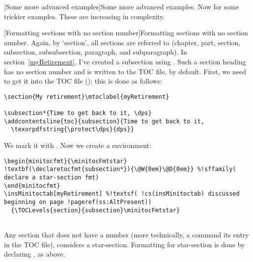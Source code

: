 \documentclass[10pt]{article}
\makeatletter
\renewcommand*{\theparagraph}{\texorpdfstring{\protect\P}{\textparagraph}}
\renewcommand*{\thesubparagraph}{\texorpdfstring{\protect\P\protect\P}{\textparagraph\textparagraph}}
\renewcommand{\paragraph}
    {\renewcommand{\@seccntformat}[1]{\theparagraph\space}%
    \@startsection{paragraph}{4}{0pt}{6pt}{-3pt}{\bfseries}}
\renewcommand{\subparagraph}
    {\renewcommand{\@seccntformat}[1]{\thesubparagraph\space}%
    \@startsection{subparagraph}{5}{\parindent}{6pt}{-3pt}{\bfseries}}
\edef\amtIndent{\the\parindent}
\def\dps{$\hbox{$\mathfrak D$\kern-.3em\hbox{$\mathfrak P$}%
   \kern-.6em \hbox{$\mathcal S$}}$}
\def\dps{$\mbox{$\mathfrak D$\kern-.3em\mbox{$\mathfrak P$}%
   \kern-.6em \hbox{$\mathcal S$}}$}
\newcommand{\insMinitoctab}[2][]{%
  \begin{center}#2
  \begin{tabular}{c}\toprule
  \begin{minipage}[c]{0.8\linewidth}
  \insertminitoc[#1]
  \end{minipage}\\ \bottomrule
  \end{tabular}
  \end{center}
}
\makeatother
\begin{document}


\paragraph[Some more advanced examples]{Some more advanced examples.}
Now for some trickier examples. These are increasing in complexity.

\subparagraph[Formatting sections with no section number]{Formatting sections
with no section number.}\label{spara:noNums} Again, by `section', all sections are referred to
(chapter, part, section, subsection, subsubsection, paragraph, and
subparagraph). In section~\ref{myRetirement}, I've created a subsection using
. Such a section heading has no section number and is written
to the TOC file, by default. First, we need to get it into the TOC file (); this
is done as follows:
\begin{Verbatim}[xleftmargin=\amtIndent,fontsize=\small]
\section{My retirement}\mtoclabel{myRetirement}

\subsection*{Time to get back to it, \dps}
\addcontentsline{toc}{subsection}{Time to get back to it,
  \texorpdfstring{\protect\dps}{dps}}
\end{Verbatim}
We mark it with . Now we create a  environment:
\begin{Verbatim}[xleftmargin=\amtIndent,fontsize=\small,commandchars=!()]
\begin{minitocfmt}{\minitocFmtstar}
!textbf(\declaretocfmt{subsection*}){\@W{0em}\@D{0em}} %!sffamily( declare a star-section fmt)
\end{minitocfmt}
\insMinitoctab[myRetirement] %!textsf( !cs(insMinitoctab) discussed beginning on page !pageref(ss:AltPresent))
  {\TOCLevels{section}{subsection}\minitocFmtstar}
\end{Verbatim}
\begin{minitocfmt}{\minitocFmtstar}
\end{minitocfmt}
\insMinitoctab[myRetirement]{\minitocFmtstar}
\newtopic\indent Any section that does not have a number (more technically,
a  command its entry in the TOC file),  considers
a star-section. Formatting for star-section is done by declaring
, as above.
\end{document}
